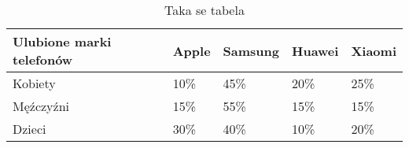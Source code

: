\begin{table}[htbp]
\centering
\begin{tabular}{|l|l|l|l|l|}
\hline
\textbf{Ulubione marki telefonów} & Apple & Samsung & Huawei & Xiaomi \\ \hline
Kobiety                           & 10\%  & 45\%    & 20\%   & 25\%   \\ \hline
Męźczyźni                         & 15\%  & 55\%    & 15\%   & 15\%   \\ \hline
Dzieci                            & 30\%  & 40\%    & 10\%   & 20\%   \\ \hline
\end{tabular}
\label{tab:telefony}
\caption{Taka se tabela}
\end{table}